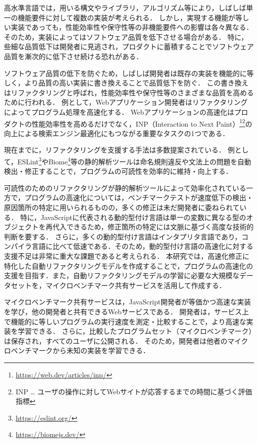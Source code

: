 \documentclass[11pt]{jreport}
\newcommand{\fix}[1]{#1}
\begin{document}
高水準言語では，用いる構文やライブラリ，アルゴリズム等により，しばしば単一の機能要件に対して複数の実装が考えられる．
しかし，実現する機能が等しい実装であっても，性能効率性や保守性等の非機能要件への影響は各々異なる．
そのため，実装によってはソフトウェア品質を低下させる場合がある．
特に，些細な品質低下は開発者に見逃され，プロダクトに蓄積することでソフトウェア品質を漸次的に低下させ続ける恐れがある．

ソフトウェア品質の低下を防ぐため，しばしば開発者は既存の実装を機能的に等しく，より品質の高い実装に書き換えることで品質低下を防ぐ\fix{\cite{Chen_2019,Traini_2021}}．
この書き換えはリファクタリングと呼ばれ，性能効率性や保守性等のさまざまな品質を高めるために行われる\fix{\cite{Sanchez_2020, Sehgal_2022,Alomar_2022}}．
例として，Webアプリケーション開発者はリファクタリングによってプログラム処理を高速化する\cite{Selakovic_2016}．
Webアプリケーションの高速化はプロダクトの性能効率性を高めるだけでなく，INP（Interaction to Next Paint）\footnote{\url{https://web.dev/articles/inp/}}\footnote{\fix{INP … ユーザの操作に対してWebサイトが応答するまでの時間に基づく評価指標}}の向上による検索エンジン最適化にもつながる重要なタスクの1つである．

現在までに，リファクタリングを支援する手法は多数提案されている\fix{\cite{Zhang_2022}}．
例として，ESLint\footnote{\url{https://eslint.org/}}やBiome\footnote{\url{https://biomejs.dev/}}等の静的解析ツールは命名規則違反や文法上の問題を自動検出・修正することで，プログラムの可読性を効率的に維持・向上する．

可読性のためのリファクタリングが静的解析ツールによって効率化されている一方で，プログラムの高速化については，ベンチマークテストが速度低下の検出・原因箇所の特定に用いられるものの，多くの修正は未だ開発者に委ねられている．
特に，JavaScriptに代表される動的型付け言語は単一の変数に異なる型のオブジェクトを再代入できるため，修正箇所の特定には文脈に基づく高度な技術的判断を要する．
さらに，多くの動的型付け言語はインタプリタ言語であり，コンパイラ言語に比べて低速である．そのため，動的型付け言語の高速化に対する支援不足は非常に重大な課題であると考えられる．
本研究では，\fix{高速化修正に特化した}自動リファクタリングモデルを作成することで，プログラムの高速化の支援を目指す．\fix{また，自動リファクタリングモデルの学習に必要な大規模なデータセットを，マイクロベンチマーク共有サービスを活用して作成する．}

マイクロベンチマーク共有サービスは，JavaScript開発者が\fix{等価かつ}高速な実装を学び，他の開発者と共有できるWebサービスである．
開発者は，サービス上で機能的に等しいプログラムの実行速度を測定・比較することで，より高速な実装を学習できる．
さらに，比較したプログラムセット（マイクロベンチマーク）は保存され，すべてのユーザに公開される．
そのため，開発者は他者のマイクロベンチマークから未知の実装を学習できる．
\end{document}
